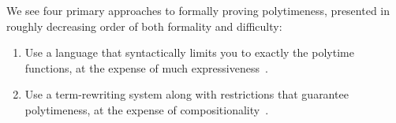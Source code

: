 \documentclass{article}
\begin{document}
We see four primary approaches to formally proving polytimeness, presented in
roughly decreasing order of both formality and difficulty:
\begin{enumerate}
\item Use a language that syntactically limits you to exactly the polytime
  functions, at the expense of much
  expressiveness~\cite{recursion92,formalization11}.

\item Use a term-rewriting system along with restrictions that guarantee
  polytimeness, at the expense of compositionality~\cite{quasi11,formal18}.


\end{enumerate}
\end{document}
